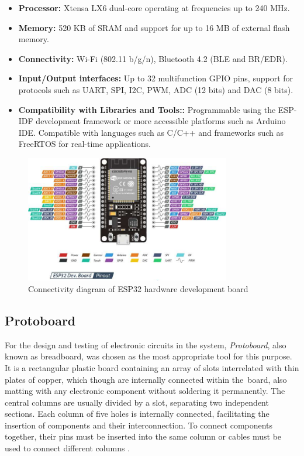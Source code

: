 \begin{itemize}
	\item \textbf{Processor:} Xtensa LX6 dual-core operating at
	frequencies up to 240 MHz.
	\item \textbf{Memory:} 520 KB of SRAM and support for up to 16 MB of external flash
	memory.
	\item \textbf{Connectivity:} Wi-Fi (802.11 b/g/n), Bluetooth 4.2 (BLE and BR/EDR).
	\item \textbf{Input/Output interfaces:}  Up to 32 multifunction GPIO pins, support for
	protocols such as UART, SPI, I2C, PWM, ADC (12 bits) and DAC (8 bits).
	\item \textbf{Compatibility with Libraries and Tools::}  Programmable using the ESP-IDF
	development framework or more accessible platforms such as Arduino IDE.
	Compatible with languages such as C/C++ and frameworks such as
	FreeRTOS for real-time applications.
\end{itemize}

\begin{figure}[h!]
	\centering
	\includegraphics[width=0.8\textwidth]{imaxes/ESP32-Pinout.jpg}
	\caption{Connectivity diagram of ESP32 hardware development board}
	\label{fig:esp32}
\end{figure}






\subsection{Protoboard}
\label{subsec:protoboard}

For the design and testing of electronic circuits in the system, \textit{Protoboard}, also
known as breadboard, was chosen as the most appropriate tool for this purpose. It is
a rectangular plastic board containing an array of slots interrelated with thin plates of
copper, which though are internally connected within the board, also matting with
any electronic component without soldering it permanently. The central columns are
usually divided by a slot, separating two independent sections. Each column of five
holes is internally connected, facilitating the insertion of components and their
interconnection. To connect components together, their pins must be inserted into
the same column or cables must be used to connect different columns \cite{Ref14}.

